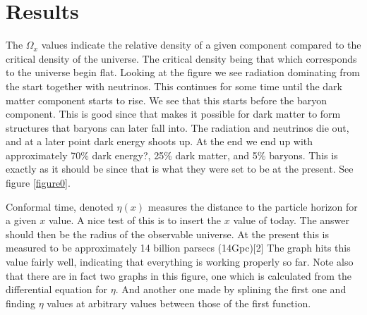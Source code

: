 \documentclass{aa}   %
\begin{document}
\section{Results}\label{sec:simulate_analytic}
 The $\Omega_x$ values indicate the relative density of a given component compared to the critical density of the universe. 
 The critical density being that which corresponds to the universe begin flat.
 Looking at the figure we see radiation dominating from the start together with neutrinos.
 This continues for some time until the dark matter component starts to rise.
 We see that this starts before the baryon component. This is good since that makes it possible for dark matter to form structures that baryons can later fall into. The radiation and neutrinos die out, and at a later point dark energy shoots up. At the end we end up with approximately 70\% dark energy?, 25\% dark matter, and 5\% baryons. This is exactly as it should be since that is what they were set to be at the present. See figure \ref{figure0}.
 
 Conformal time, denoted $\eta(x)$ measures the distance to the particle horizon for a given $x$ value. A nice test of this is to insert the $x$ value of today.
 The answer should then be the radius of the observable universe. At the present this is measured to be approximately 14 billion parsecs (14Gpc)[2]
 The graph hits this value fairly well, indicating that everything is working properly so far. 
 Note also that there are in fact two graphs in this figure, one which is calculated from the differential equation for $\eta$. 
 And another one made by splining the first one and finding $\eta$ values at arbitrary values between those of the first function.
 
 
\end{document}
